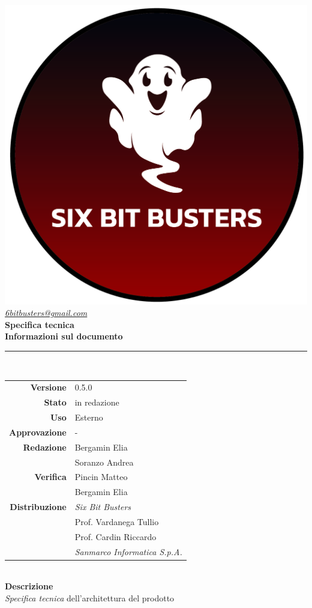 \thispagestyle{empty}
\renewcommand{\arraystretch}{1.3}


\begin{titlepage}
	\begin{center}
		
	\includegraphics[scale = 0.6]{template/images/logo-circle.png}
	\\[0.8cm]
	\href{mailto:6bitbusters@gmail.com}		      	
	{\large{\textit{6bitbusters@gmail.com} } }\\[0.8cm]
	
	\Huge \textbf{Specifica tecnica} \\[0.5cm]

	\large \textbf{Informazioni sul documento} \\
	\rule{0.6\textwidth}{0.4pt}
	\\[0.5cm]
	\begin{tabular}{r|l}
		\textbf{Versione} & 0.5.0\\
		\textbf{Stato} & in redazione\\
		\textbf{Uso} & Esterno\\                         
		\textbf{Approvazione} & -\\                      
		\textbf{Redazione} & Bergamin Elia \\ & Soranzo Andrea \\
		\textbf{Verifica} & Pincin Matteo \\ & Bergamin Elia \\                    
		\textbf{Distribuzione} & \textit{Six Bit Busters} \\ & Prof. Vardanega Tullio \\ & Prof. Cardin Riccardo \\ & \textit{Sanmarco Informatica S.p.A.}
	\end{tabular}	
	\\[0.8cm]

	\large \textbf{Descrizione} \\ \textit{Specifica tecnica} dell'architettura del prodotto
	
	\end{center}
\end{titlepage}
